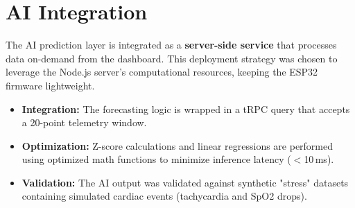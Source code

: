 \section{AI Integration}
The AI prediction layer is integrated as a \textbf{server-side service} that processes data on-demand from the dashboard. This deployment strategy was chosen to leverage the Node.js server's computational resources, keeping the ESP32 firmware lightweight.
\begin{itemize}
    \item \textbf{Integration:} The forecasting logic is wrapped in a tRPC query that accepts a 20-point telemetry window.
    \item \textbf{Optimization:} Z-score calculations and linear regressions are performed using optimized math functions to minimize inference latency ($<$10\,ms).
    \item \textbf{Validation:} The AI output was validated against synthetic "stress" datasets containing simulated cardiac events (tachycardia and SpO2 drops).
\end{itemize}
